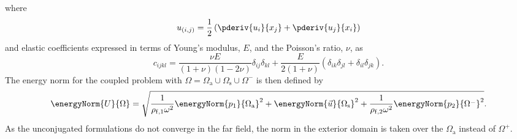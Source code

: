 where
\begin{equation*}
	u_{(i,j)} = \frac{1}{2}\left(\pderiv{u_i}{x_j} + \pderiv{u_j}{x_i}\right)
\end{equation*}
and elastic coefficients expressed in terms of Young's modulus, $E$, and the Poisson's ratio, $\nu$, as~\cite[p. 110]{Cottrell2009iat}
\begin{equation*}
	c_{ijkl} = \frac{\nu E}{(1+\nu)(1-2\nu)}\delta_{ij}\delta_{kl} +\frac{E}{2(1+\nu)}(\delta_{ik}\delta_{jl} + \delta_{il}\delta_{jk}).
\end{equation*}
The energy norm for the coupled problem with $\Omega = \Omega_{\mathrm{a}}\cup \Omega_{\mathrm{s}}\cup\Omega^-$ is then defined by
\begin{align}\label{Eq2:energyNorm}
	\energyNorm{U}{\Omega} = \sqrt{\frac{1}{\rho_{\mathrm{f},1}\omega^2}\energyNorm{p_1}{\Omega_{\mathrm{a}}}^2 + \energyNorm{\vec{u}}{\Omega_{\mathrm{s}}}^2 + \frac{1}{\rho_{\mathrm{f},2}\omega^2}\energyNorm{p_2}{\Omega^-}^2}.
\end{align}
As the unconjugated formulations do not converge in the far field, the norm in the exterior domain is taken over the $\Omega_{\mathrm{a}}$ instead of $\Omega^+$. 